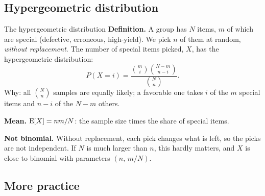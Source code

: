 
\subsection*{Hypergeometric distribution}

\begin{key}{The hypergeometric distribution}
	\setlength{\parskip}{5pt}
	\textbf{Definition.} A group has $N$ items, $m$ of which are special
	(defective, erroneous, high-yield). We pick $n$ of them at random,
	\emph{without replacement}. The number of special items picked, $X$, has
	the hypergeometric distribution:
	\[ P(X=i)=\frac{\binom{m}{i}\binom{N-m}{n-i}}{\binom{N}{n}}. \]
	Why: all $\binom{N}{n}$ samples are equally likely; a favorable one
	takes $i$ of the $m$ special items and $n-i$ of the $N-m$ others.
	\begin{center}
		\fighyper
	\end{center}

	\textbf{Mean.} $\operatorname{E}[X]=nm/N$: the sample size times the share of special
	items.

	\textbf{Not binomial.} Without replacement, each pick changes what is
	left, so the picks are not independent. If $N$ is much larger than $n$,
	this hardly matters, and $X$ is close to binomial with parameters
	$(n,\,m/N)$.
\end{key}


\subsection*{More practice}

